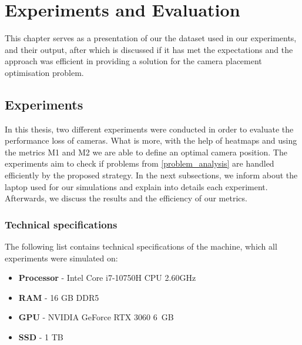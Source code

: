 \chapter{Experiments and Evaluation}
\label{evaluation}

This chapter serves as a presentation of our the dataset used in our experiments, and their output, after which is discussed if it has met the expectations and the approach was efficient in providing a solution for the camera placement optimisation problem.

\section{Experiments}
In this thesis, two different experiments were conducted in order to evaluate the performance loss of cameras. What is more, with the help of heatmaps and using the metrics M1 and M2 we are able to define an optimal camera position. The experiments aim to check if problems from \ref{problem_analysis} are handled efficiently by the proposed strategy. In the next subsections, we inform about the laptop used for our simulations and explain into details each experiment. Afterwards, we discuss the results and the efficiency of our metrics.

\subsection{Technical specifications}
The following list contains technical specifications of the machine, which all experiments were simulated on:
\begin{itemize}
    \item \textbf{Processor} - Intel Core i7-10750H CPU 2.60GHz
    \item \textbf{RAM} - 16 GB DDR5
    \item \textbf{GPU} - NVIDIA GeForce RTX 3060 6 GB
    \item \textbf{SSD} - 1 TB
\end{itemize}

\newpage
